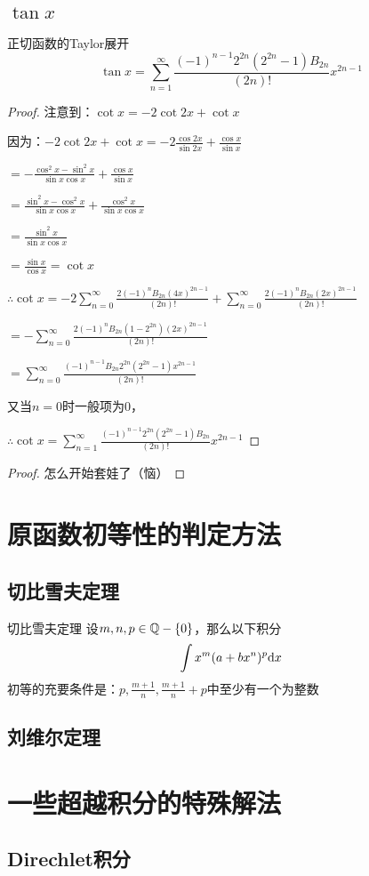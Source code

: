\documentclass[12pt, a4paper, oneside, UTF8]{ctexbook}
\begin{document}
		\subsection{$\tan x$}
			\begin{them}{正切函数的Taylor展开}{}
				\begin{equation}
					\tan x = \sum\limits_{n=1}^{\infty} \frac{(-1)^{n-1}2^{2n}(2^{2n}-1)B_{2n}}{(2n)!}x^{2n-1}
				\end{equation}
			\end{them}
			\begin{proof}
				注意到：$\cot x = -2 \cot 2x +\cot x$
				
				因为：$-2\cot 2x+\cot x = -2\frac{\cos 2x}{\sin 2x}+\frac{\cos x}{\sin x}$
				
				$=-\frac{\cos^2 x-\sin^2 x}{\sin x\cos x}+\frac{\cos x}{\sin x}$
				
				$=\frac{\sin^2 x-\cos^2 x}{\sin x\cos x}+\frac{\cos^2 x}{\sin x\cos x}$
				
				$=\frac{\sin^2 x}{\sin x\cos x}$
				
				$=\frac{\sin x}{\cos x}=\cot x$
				
				$\therefore \cot x = -2\sum\limits_{n=0}^{\infty}\frac{2(-1)^n B_{2n} (4x)^{2n-1}}{(2n)!}+\sum\limits_{n=0}^{\infty}\frac{2(-1)^n B_{2n} (2x)^{2n-1}}{(2n)!} $
				
				$=-\sum\limits_{n=0}^{\infty}\frac{2(-1)^n B_{2n} (1-2^{2n}) (2x)^{2n-1}}{(2n)!}$
				
				$=\sum\limits_{n=0}^{\infty}\frac{(-1)^{n-1} B_{2n} 2^{2n}(2^{2n}-1) x^{2n-1}}{(2n)!}$
				
				又当$n=0$时一般项为0，
				
				$\therefore \cot x = \sum\limits_{n=1}^{\infty}\frac{(-1)^{n-1} 2^{2n}(2^{2n}-1) B_{2n}}{(2n)!}  x^{2n-1}$
			\end{proof}
			\begin{proof}
				怎么开始套娃了（恼）
			\end{proof}
	
	\section{原函数初等性的判定方法}
		\subsection{切比雪夫定理}
			\begin{them}{切比雪夫定理}{}
				设$m,n,p\in \mathbb{Q}-\{0\}$，那么以下积分
				\begin{equation}
					\int x^m(a+bx^n)^p \mathrm{d} x
				\end{equation}
				初等的充要条件是：$p,\frac{m+1}{n},\frac{m+1}{n}+p$中至少有一个为整数
			\end{them}
		\subsection{刘维尔定理}
	
	\section{一些超越积分的特殊解法}
		\subsection{Direchlet积分}
		
	
	\ifx\allfiles\undefined
\end{document}
